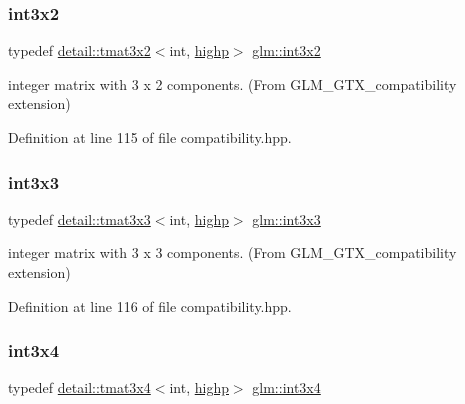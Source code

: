 \subsubsection{\texorpdfstring{int3x2}{int3x2}}
{\footnotesize\ttfamily typedef \hyperlink{structglm_1_1detail_1_1tmat3x2}{detail\+::tmat3x2}$<$int, \hyperlink{namespaceglm_a0f04f086094c747d227af4425893f545ac6f7eab42eacbb10d59a58e95e362074}{highp}$>$ \hyperlink{group__gtx__compatibility_ga2b1f3046fb4692c0c2f76b3933389868}{glm\+::int3x2}}



integer matrix with 3 x 2 components. (From G\+L\+M\+\_\+\+G\+T\+X\+\_\+compatibility extension) 



Definition at line 115 of file compatibility.\+hpp.

\mbox{\label{group__gtx__compatibility_ga8773c9f240dcac9f28d1afef71f7f779}} 
\subsubsection{\texorpdfstring{int3x3}{int3x3}}
{\footnotesize\ttfamily typedef \hyperlink{structglm_1_1detail_1_1tmat3x3}{detail\+::tmat3x3}$<$int, \hyperlink{namespaceglm_a0f04f086094c747d227af4425893f545ac6f7eab42eacbb10d59a58e95e362074}{highp}$>$ \hyperlink{group__gtx__compatibility_ga8773c9f240dcac9f28d1afef71f7f779}{glm\+::int3x3}}



integer matrix with 3 x 3 components. (From G\+L\+M\+\_\+\+G\+T\+X\+\_\+compatibility extension) 



Definition at line 116 of file compatibility.\+hpp.

\mbox{\label{group__gtx__compatibility_ga7cb1c0960d6551c34c666ad5829e9c65}} 
\subsubsection{\texorpdfstring{int3x4}{int3x4}}
{\footnotesize\ttfamily typedef \hyperlink{structglm_1_1detail_1_1tmat3x4}{detail\+::tmat3x4}$<$int, \hyperlink{namespaceglm_a0f04f086094c747d227af4425893f545ac6f7eab42eacbb10d59a58e95e362074}{highp}$>$ \hyperlink{group__gtx__compatibility_ga7cb1c0960d6551c34c666ad5829e9c65}{glm\+::int3x4}}



